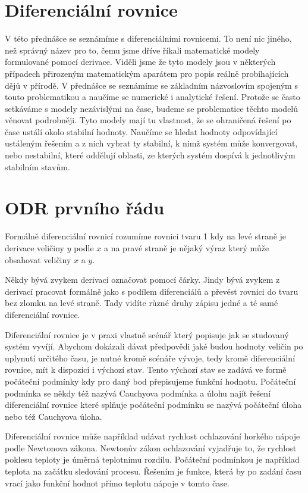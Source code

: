 \documentclass[12pt]{article}
\begin{document}
\section*{Diferenciální rovnice}

V této přednášce se seznámíme s diferenciálními rovnicemi. To není nic jiného, než správný název pro to, čemu jsme dříve říkali matematické modely formulované pomocí derivace. Viděli jsme že tyto modely jsou v některých případech přirozeným matematickým aparátem pro popis reálně probíhajících dějů v přírodě. V přednášce se seznámíme se základním názvoslovím spojeným s touto problematikou a naučíme se numerické i analytické řešení. Protože se často setkáváme s modely nezávislými na čase, budeme se problematice těchto modelů věnovat podrobněji. Tyto modely mají tu vlastnost, že se ohraničená řešení po čase ustálí okolo stabilní hodnoty. Naučíme se hledat hodnoty odpovídající ustáleným řešením a z nich vybrat ty stabilní, k nimž systém může konvergovat, nebo nestabilní, které oddělují oblasti, ze kterých systém dospívá k jednotlivým stabilním stavům.

\section*{ODR prvního řádu}

Formálně diferenciální rovnicí rozumíme rovnici tvaru 1 kdy na levé straně je derivace veličiny $y$ podle $x$ a na pravé straně je nějaký výraz který může obsahovat veličiny $x$ a $y$. 

Někdy bývá zvykem derivaci označovat pomocí čárky. Jindy bývá zvykem z derivací pracovat formálně jako s podílem diferenciálů a převést rovnici do tvaru bez zlomku na levé straně. Tady vidíte různé druhy zápisu jedné a té samé diferenciální rovnice.

Diferenciální rovnice je v praxi vlastně scénář který popisuje jak se studovaný systém vyvíjí. Abychom dokázali dávat předpovědi jaké budou hodnoty veličin po uplynutí určitého času, je nutné kromě scénáře vývoje, tedy kromě diferenciální rovnice, mít k dispozici i výchozí stav. Tento výchozí stav se zadává ve formě počáteční podmínky kdy pro daný bod přepisujeme funkční hodnotu. Počáteční podmínka se někdy též nazývá Cauchyova podmínka a úlohu najít řešení diferenciální rovnice které splňuje počáteční podmínku se nazývá počáteční úloha nebo též Cauchyova úloha.

Diferenciální rovnice může například udávat rychlost ochlazování horkého nápoje podle Newtonova zákona. Newtonův zákon ochlazování vyjadřuje to, že rychlost poklesu teploty je úměrná teplotnímu rozdílu. Počáteční podmínkou je například teplota na začátku sledování procesu. Řešením je funkce, která by po zadání času vrací jako funkční hodnot přímo teplotu nápoje v tomto čase. 
\end{document}

